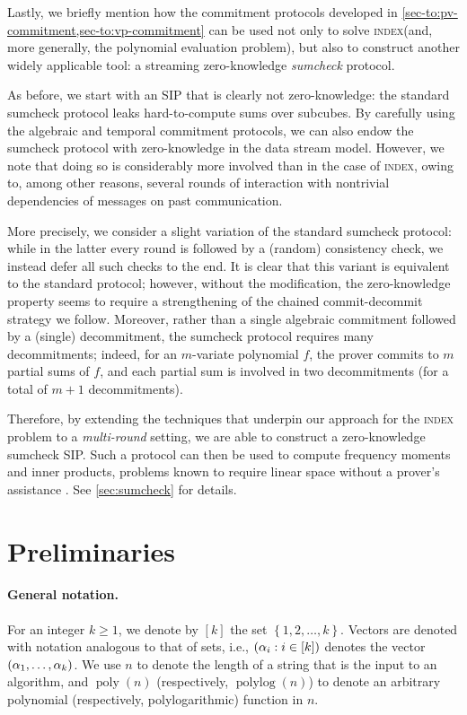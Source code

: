 \documentclass[10pt,a4paper]{article}
\newif\iflipics\lipicsfalse
\theoremstyle{definition}
\renewcommand{\set}[1]{\left\{#1\right\}}
\newcommand{\poly}{\operatorname{poly}}
\newcommand{\polylog}{\operatorname{polylog}}
\newcommand{\indexproblem}{\normalfont\textsc{index}\xspace}
\newcommand{\dimension}{m}
\def\fe#1{
    \ifnum#1=1
        \alpha
    \else
    \ifnum#1=2
        \beta
    \else
    \ifnum#1=3
        \gamma
    \fi\fi\fi
}
\begin{document}
    Lastly, we briefly mention how the commitment protocols developed in \cref{sec-to:pv-commitment,sec-to:vp-commitment} can be used not only to solve \indexproblem (and, more generally, the polynomial evaluation problem), but also to construct another widely applicable tool: a streaming zero-knowledge \emph{sumcheck} protocol.
    
    As before, we start with an SIP that is clearly not zero-knowledge: the standard sumcheck protocol leaks hard-to-compute sums over subcubes. By carefully using the algebraic and temporal commitment protocols, we can also endow the sumcheck protocol with zero-knowledge in the data stream model. However, we note that doing so is considerably more involved than in the case of \indexproblem, owing to, among other reasons, several rounds of interaction with nontrivial dependencies of messages on past communication.
    
    More precisely, we consider a slight variation of the standard sumcheck protocol: while in the latter every round is followed by a (random) consistency check, we instead defer all such checks to the end. It is clear that this variant is equivalent to the standard protocol; however, without the modification, the zero-knowledge property seems to require a strengthening of the chained commit-decommit strategy we follow. Moreover, rather than a single algebraic commitment followed by a (single) decommitment, the sumcheck protocol requires many decommitments; indeed, for an $\dimension$-variate polynomial $f$, the prover commits to $\dimension$ partial sums of $f$, and each partial sum is involved in two decommitments (for a total of $\dimension + 1$ decommitments).
    
    Therefore, by extending the techniques that underpin our approach for the \indexproblem problem to a \emph{multi-round} setting, we are able to construct a zero-knowledge sumcheck SIP. Such a protocol can then be used to  compute frequency moments and inner products, problems known to require linear space without a prover's assistance \cite{AMS99}. See \cref{sec:sumcheck} for details.

\section{Preliminaries}
\label{sec:preliminaries}

    \paragraph*{General notation\iflipics\else.\fi} For an integer $k \geq1$, we denote by $[k]$ the set $\set{1,2, \ldots, k}$. Vectors are denoted with notation analogous to that of sets, i.e., $(\fe1_i : i \in [k])$ denotes the vector $(\fe1_1, \ldots, \fe1_k)$. We use $n$ to denote the length of a string that is the input to an algorithm, and $\poly(n)$ (respectively, $\polylog(n)$) to denote an arbitrary polynomial (respectively, polylogarithmic) function in $n$.
    
\end{document}
